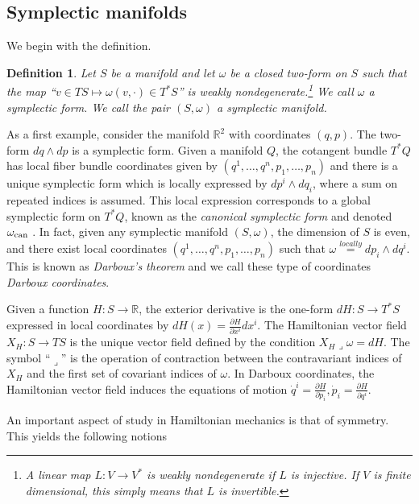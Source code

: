 \documentclass[12pt]{amsart}
\newcommand{\pder}[2]{\ensuremath{\frac{\partial #1}{\partial #2}}}
\newcommand{\R}{\ensuremath{\mathbb{R}}}
\newtheorem{defn}[thm]{Definition}
\begin{document}
\subsection{Symplectic manifolds}
\label{sec:Symplectic}
We begin with the definition.
\begin{defn}
  Let $S$ be a manifold
  and let $\omega$ be a closed two-form on $S$ such that the map
  ``$v \in TS \mapsto \omega( v , \cdot ) \in T^*S$'' is weakly nondegenerate.\footnote{
    A linear map $L:V \to V^*$ is \emph{weakly nondegenerate} if $L$ is injective.  If $V$ is finite dimensional, this simply means that $L$ is invertible.}
  We call $\omega$ a \emph{symplectic form}.
  We call the pair $(S,\omega)$ a \emph{symplectic manifold}.
\end{defn}
As a first example, consider the manifold $\R^2$
with coordinates $(q,p)$.
The two-form $dq \wedge dp$ is a symplectic form.
Given a manifold $Q$,
the cotangent bundle $T^*Q$ has local fiber bundle coordinates
given by $(q^1,\dots, q^n,p_1,\dots,p_n)$ and there is a unique symplectic form
which is locally expressed by $dp^i \wedge dq_i$, where
a sum on repeated indices is assumed.
This local expression corresponds to a global symplectic
form on $T^*Q$, known as the \emph{canonical symplectic form}
and denoted $\omega_{\rm can}$ \cite[Theorem 3.2.10]{FOM}.
In fact, given any symplectic manifold $(S,\omega)$, the dimension of $S$
is even, and there exist local coordinates $(q^1,\dots,q^n,p_1,\dots,p_n)$
such that $\omega \stackrel{locally}{=} dp_i \wedge dq^i$.
This is known as \emph{Darboux's theorem} and we call these type of
coordinates \emph{Darboux coordinates}\cite[Theorem 3.2.2]{FOM}.

Given a function $H:S \to \mathbb{R}$,
the exterior derivative is the one-form $dH:S \to T^*S$
expressed in local coordinates by $dH(x) = \pder{H}{x^i} dx^i$.
The Hamiltonian vector field $X_H:S \to TS$ is the unique vector
field defined by the condition
$
  X_H \lrcorner \omega = dH.
$
The symbol ``$\lrcorner$'' is the operation of contraction between
the contravariant indices of $X_H$ and the first set of covariant
indices of $\omega$.
In Darboux coordinates, the Hamiltonian vector field induces the
equations of motion $\dot{q}^i = \pder{H}{p_i}, \dot{p}_i = \pder{H}{q^i}$.


An important aspect of study in Hamiltonian mechanics is that of symmetry.
This yields the following notions
\end{document}
